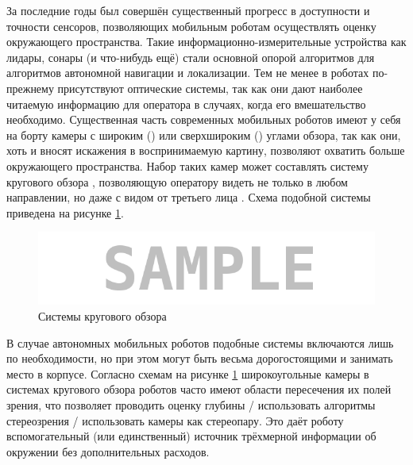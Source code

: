 За последние годы был совершён существенный прогресс в доступности и точности сенсоров, позволяющих мобильным роботам 
осуществлять оценку окружающего пространства. Такие информационно-измерительные устройства как лидары, сонары (и что-нибудь                     %
ещё) стали основной опорой алгоритмов для алгоритмов автономной навигации и локализации. Тем не менее в роботах по-прежнему 
присутствуют оптические системы, так как они дают наиболее читаемую информацию для оператора в случаях, когда его вмешательство 
необходимо. Существенная часть современных мобильных роботов имеют у себя на борту камеры с широким () или сверхшироким ()                      %
углами обзора, так как они, хоть и вносят искажения в воспринимаемую картину, позволяют охватить больше окружающего пространства.               %
Набор таких камер может составлять систему кругового обзора \cite{}, позволяющую оператору видеть не только в любом направлении,                %
но даже с видом от третьего лица \cite{}. Схема подобной системы приведена на рисунке \ref{pic:examples}. 

\begin{figure}[H]
    \begin{center}
        \includegraphics[scale=0.5]{pics/sample.png}                                                                                            %
        \caption{Системы кругового обзора}
        \label{pic:examples}
    \end{center}
\end{figure}
    
В случае автономных мобильных роботов подобные системы включаются лишь по необходимости, но при этом могут быть весьма 
дорогостоящими и занимать место в корпусе.                                                                                                      %
Согласно схемам на рисунке \ref{pic:examples} широкоугольные камеры в системах кругового обзора роботов часто имеют области                     %
пересечения их полей зрения, что позволяет проводить оценку глубины / использовать алгоритмы стереозрения / использовать камеры как стереопару. %
Это даёт роботу вспомогательный (или единственный) источник трёхмерной информации об окружении без дополнительных расходов.                     %

